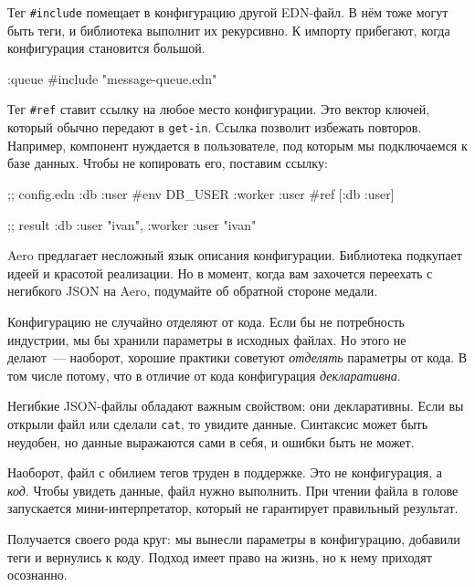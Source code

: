 Тег \verb|#include| помещает в конфигурацию другой EDN-файл. В нём тоже могут
быть теги, и библиотека выполнит их рекурсивно. К импорту прибегают, когда
конфигурация становится большой.

\begin{english}
  \begin{clojure}
{:queue #include "message-queue.edn"}
  \end{clojure}
\end{english}

Тег \verb|#ref| ставит ссылку на любое место конфигурации. Это вектор ключей,
который обычно передают в \verb|get-in|. Ссылка позволит избежать повторов.
Например, компонент нуждается в пользователе, под которым мы подключаемся к базе
данных. Чтобы не копировать его, поставим ссылку:

\begin{english}
  \begin{clojure}
;; config.edn
{:db {:user #env DB_USER}
 :worker {:user #ref [:db :user]}}

;; result
{:db {:user "ivan"}, :worker {:user "ivan"}}
  \end{clojure}
\end{english}

Aero предлагает несложный язык описания конфигурации. Библиотека подкупает идеей
и красотой реализации. Но в момент, когда вам захочется переехать с негибкого
JSON на Aero, подумайте об обратной стороне медали.


Конфигурацию не случайно отделяют от кода. Если бы не потребность индустрии, мы
бы хранили параметры в исходных файлах. Но этого не делают~--- наоборот, хорошие
практики советуют \emph{отделять} параметры от кода. В том числе потому, что в
отличие от кода конфигурация \emph{декларативна}.

Негибкие JSON-файлы обладают важным свойством: они декларативны. Если вы открыли
файл или сделали \verb|cat|, то увидите данные. Синтаксис может быть неудобен,
но данные выражаются сами в себя, и ошибки быть не может.

Наоборот, файл с обилием тегов труден в поддержке. Это не конфигурация,
а \emph{код}. Чтобы увидеть данные, файл нужно выполнить. При чтении
файла в голове запускается мини-интерпретатор, который не гарантирует
правильный результат.

Получается своего рода круг: мы вынесли параметры в конфигурацию, добавили теги
и вернулись к коду. Подход имеет право на жизнь, но к нему приходят осознанно.

